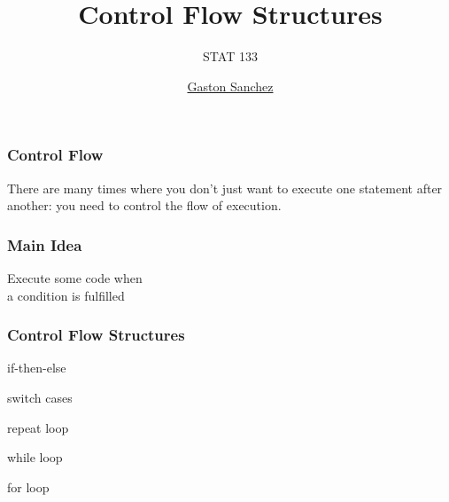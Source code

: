 \documentclass[12pt]{beamer}\usepackage[]{graphicx}\usepackage[]{color}
\title{Control Flow Structures}
\subtitle{STAT 133}
\author{\href{http://www.gastonsanchez.com}{Gaston Sanchez}}
\institute{\href{https://github.com/ucb-stat133/stat133-fall-2016}{\tt \scriptsize \color{foreground} github.com/ucb-stat133/stat133-fall-2016}}
\date{}
\begin{document}
{
  \frame{
    \titlepage
  } 
}



\begin{frame}
\begin{center}
\Huge{}
\end{center}
\end{frame}


\begin{frame}
\frametitle{Control Flow}

There are many times where you don't just want to execute one statement after another: you need to control the flow of execution.

\end{frame}


\begin{frame}
\frametitle{Main Idea}

\begin{center}
{\mdlit \Large Execute some code when \\ a condition is fulfilled}
\end{center}

\end{frame}


\begin{frame}
\frametitle{Control Flow Structures}

\bi
  \item if-then-else
  \item switch cases
  \item repeat loop
  \item while loop
  \item for loop
\ei

\end{frame}


\begin{frame}
\begin{center}
\Huge{}
\end{center}
\end{frame}

\end{document}

